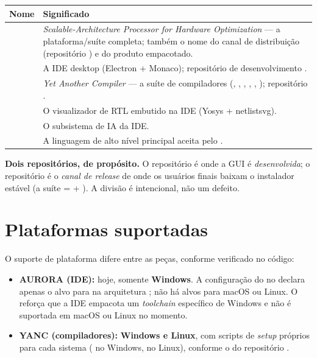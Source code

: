 \begin{tabularx}{\linewidth}{l Y}
\toprule
\textbf{Nome} & \textbf{Significado} \\
\midrule
{} & \emph{Scalable-Architecture Processor for Hardware Optimization} --- a
plataforma/suíte completa; também o nome do canal de distribuição
(repositório ) e do produto empacotado. \\
 & A IDE desktop (Electron + Monaco); repositório de
desenvolvimento . \\
 & \emph{Yet Another Compiler} --- a suíte de compiladores
(, , , , ,
);
repositório . \\
 & O visualizador de RTL embutido na IDE (Yosys + netlistsvg). \\
 & O subsistema de IA da IDE. \\
\cmm{} & A linguagem de alto nível principal aceita pelo . \\
\bottomrule
\end{tabularx}

\begin{nota}
\textbf{Dois repositórios, de propósito.} O repositório  é onde a
GUI é \emph{desenvolvida}; o repositório  é o \emph{canal de
release} de onde os usuários finais baixam o instalador estável (a suíte =
 + ). A divisão é intencional, não um defeito.
\end{nota}

\section{Plataformas suportadas}
\label{sec:01-plataformas}

O suporte de plataforma difere entre as peças, conforme verificado no código:

\begin{itemize}
  \item \textbf{AURORA (IDE):} hoje, somente \textbf{Windows}. A configuração do
         no  declara apenas o alvo
         para  na arquitetura ; não há alvos para
        macOS ou Linux. O  reforça que a IDE empacota um
        \emph{toolchain} específico de Windows e não é suportada em macOS ou
        Linux no momento.
  \item \textbf{YANC (compiladores):} \textbf{Windows e Linux}, com scripts de
        \emph{setup} próprios para cada sistema ( no
        Windows,  no Linux), conforme o 
        do repositório .
\end{itemize}

